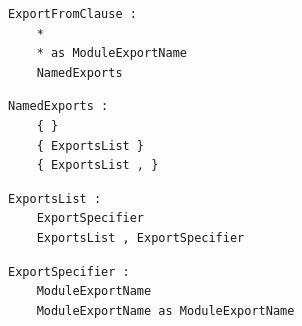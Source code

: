 \noindent\textbf{\texttt{}}\par
\begin{lstlisting}
ExportFromClause :
    *
    * as ModuleExportName
    NamedExports
\end{lstlisting}

\noindent\textbf{\texttt{}}\par
\begin{lstlisting}
NamedExports :
    { }
    { ExportsList }
    { ExportsList , }
\end{lstlisting}

\noindent\textbf{\texttt{}}\par
\begin{lstlisting}
ExportsList :
    ExportSpecifier
    ExportsList , ExportSpecifier
\end{lstlisting}

\noindent\textbf{\texttt{}}\par
\begin{lstlisting}
ExportSpecifier :
    ModuleExportName
    ModuleExportName as ModuleExportName
\end{lstlisting}

